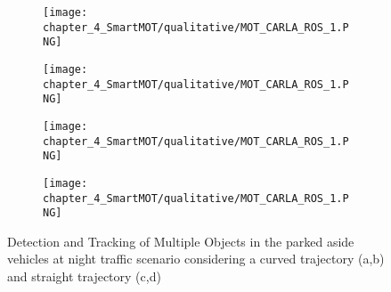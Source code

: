 \begin{figure}[h]
	\centering
	\begin{subfigure}{0.24\textwidth}
		\captionsetup{justification=centering}
		\texttt{[image: chapter\_4\_SmartMOT/qualitative/MOT\_CARLA\_ROS\_1.PNG]}
		\caption{}
	\end{subfigure}
	\hfill
	\begin{subfigure}{0.24\textwidth}
		\captionsetup{justification=centering}
		\texttt{[image: chapter\_4\_SmartMOT/qualitative/MOT\_CARLA\_ROS\_1.PNG]}
		\caption{}
	\end{subfigure}
	\hfill
	\begin{subfigure}{0.24\textwidth}
		\captionsetup{justification=centering}
		\texttt{[image: chapter\_4\_SmartMOT/qualitative/MOT\_CARLA\_ROS\_1.PNG]}
		\caption{}
	\end{subfigure}
	\hfill
	\begin{subfigure}{0.24\textwidth}
		\captionsetup{justification=centering}
		\texttt{[image: chapter\_4\_SmartMOT/qualitative/MOT\_CARLA\_ROS\_1.PNG]}
		\caption{}
	\end{subfigure}
	\caption[Detection and Tracking of Multiple Objects in the CARLA simulator]{Detection and Tracking of Multiple Objects in the parked aside vehicles at night traffic scenario considering a curved trajectory (a,b) and straight trajectory (c,d)}
	\label{fig:chapter_4_SmartMOT/MOT_CARLA}
\end{figure}

